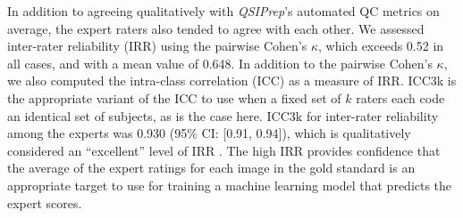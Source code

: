 \documentclass[fleqn,10pt]{wlscirep}
\begin{document}
In addition to agreeing qualitatively with \emph{QSIPrep}'s automated QC metrics
on average, the expert raters also tended to agree with each other. We assessed
inter-rater reliability (IRR) using the pairwise Cohen's $\kappa$, which
\cite{di-eugenio2004-bb} exceeds 0.52 in all cases, and with a mean value of
0.648. In addition to the pairwise Cohen's $\kappa$, we also computed the
intra-class correlation (ICC) \cite{hallgren2012-ze} as a measure of IRR. ICC3k
is the appropriate variant of the ICC to use when a fixed set of $k$ raters each
code an identical set of subjects, as is the case here. ICC3k for inter-rater
reliability among the experts was 0.930 (95\% CI: [0.91, 0.94]), which is
qualitatively considered an ``excellent'' level of IRR \cite{Cicchetti1994-fz}.
The high IRR provides confidence that the average of the expert ratings for each
image in the gold standard is an appropriate target to use for training a
machine learning model that predicts the expert scores.
\end{document}
